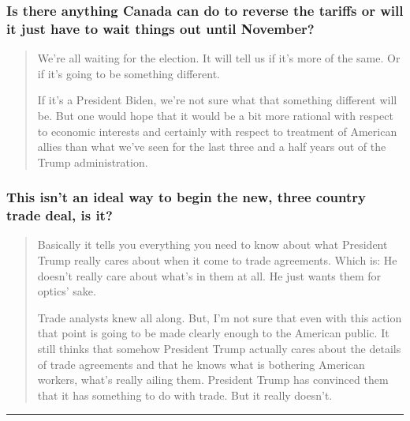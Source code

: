 \hypertarget{is-there-anything-canada-can-do-to-reverse-the-tariffs-or-will-it-just-have-to-wait-things-out-until-november}{%
\subsubsection{Is there anything Canada can do to reverse the tariffs or
will it just have to wait things out until
November?}\label{is-there-anything-canada-can-do-to-reverse-the-tariffs-or-will-it-just-have-to-wait-things-out-until-november}}

\begin{quote}
We're all waiting for the election. It will tell us if it's more of the
same. Or if it's going to be something different.

If it's a President Biden, we're not sure what that something different
will be. But one would hope that it would be a bit more rational with
respect to economic interests and certainly with respect to treatment of
American allies than what we've seen for the last three and a half years
out of the Trump administration.
\end{quote}

\hypertarget{this-isnt-an-ideal-way-to-begin-the-new-three-country-trade-deal-is-it}{%
\subsubsection{This isn't an ideal way to begin the new, three country
trade deal, is
it?}\label{this-isnt-an-ideal-way-to-begin-the-new-three-country-trade-deal-is-it}}

\begin{quote}
Basically it tells you everything you need to know about what President
Trump really cares about when it come to trade agreements. Which is: He
doesn't really care about what's in them at all. He just wants them for
optics' sake.

Trade analysts knew all along. But, I'm not sure that even with this
action that point is going to be made clearly enough to the American
public. It still thinks that somehow President Trump actually cares
about the details of trade agreements and that he knows what is
bothering American workers, what's really ailing them. President Trump
has convinced them that it has something to do with trade. But it really
doesn't.
\end{quote}

\begin{center}\rule{0.5\linewidth}{\linethickness}\end{center}

